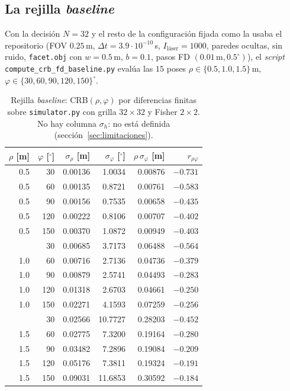 \documentclass[11pt,a4paper]{article}
\newcommand{\code}[1]{\texttt{#1}}
\theoremstyle{definition}
\theoremstyle{plain}
\begin{document}
\subsection{La rejilla \emph{baseline}}

Con la decisión $N=32$ y el resto de la configuración fijada como la usaba el
repositorio (FOV $0.25\,$m, $\Delta t=3.9\cdot10^{-10}\,$s,
$I_{\text{láser}}=1000$, paredes ocultas, sin ruido, \code{facet.obj} con
$w=0.5\,$m, $b=0.1$, pasos FD $(0.01\,\text{m},0.5^\circ)$), el
\emph{script} \code{compute\_crb\_fd\_baseline.py} evalúa las $15$ poses
$\rho\in\{0.5,1.0,1.5\}\,$m, $\varphi\in\{30,60,90,120,150\}^\circ$.

\begin{table}[htbp]
\centering
\caption{Rejilla \emph{baseline}: CRB$(\rho,\varphi)$ por diferencias finitas
sobre \code{simulator.py} con grilla $32\times32$ y Fisher $2\times2$. No hay
columna $\sigma_h$: no está definida (sección~\ref{sec:limitaciones}).}
\label{tab:baseline}
\begin{tabular}{@{}rr rrrr@{}}
\toprule
$\rho$ [m] & $\varphi$ [$^\circ$] & $\sigma_\rho$ [m]
& $\sigma_\varphi$ [$^\circ$] & $\rho\,\sigma_\varphi$ [m]
& $r_{\rho\varphi}$ \\
\midrule
0.5 & 30 & 0.00136 & 1.0034 & 0.00876 & $-0.731$ \\
0.5 & 60 & 0.00135 & 0.8721 & 0.00761 & $-0.583$ \\
0.5 & 90 & 0.00156 & 0.7535 & 0.00658 & $-0.435$ \\
0.5 & 120 & 0.00222 & 0.8106 & 0.00707 & $-0.402$ \\
0.5 & 150 & 0.00370 & 1.0872 & 0.00949 & $-0.403$ \\
\addlinespace
1.0 & 30 & 0.00685 & 3.7173 & 0.06488 & $-0.564$ \\
1.0 & 60 & 0.00716 & 2.7136 & 0.04736 & $-0.379$ \\
1.0 & 90 & 0.00879 & 2.5741 & 0.04493 & $-0.283$ \\
1.0 & 120 & 0.01318 & 2.6703 & 0.04661 & $-0.250$ \\
1.0 & 150 & 0.02271 & 4.1593 & 0.07259 & $-0.256$ \\
\addlinespace
1.5 & 30 & 0.02566 & 10.7727 & 0.28203 & $-0.452$ \\
1.5 & 60 & 0.02775 & 7.3200 & 0.19164 & $-0.280$ \\
1.5 & 90 & 0.03482 & 7.2896 & 0.19084 & $-0.209$ \\
1.5 & 120 & 0.05176 & 7.3811 & 0.19324 & $-0.191$ \\
1.5 & 150 & 0.09031 & 11.6853 & 0.30592 & $-0.184$ \\
\bottomrule
\end{tabular}
\end{table}
\end{document}
